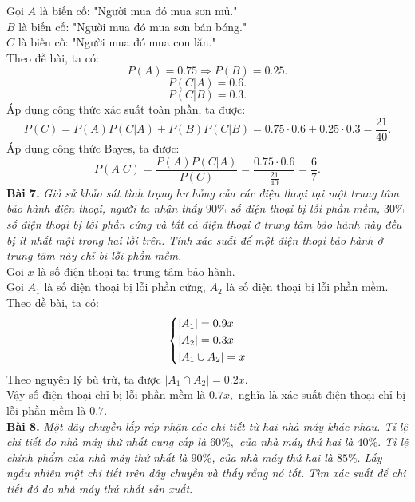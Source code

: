 \documentclass[12pt,a4paper]{article}
\begin{document}
Gọi $A$ là biến cố: "Người mua đó mua sơn mủ."\\
$B$ là biến cố: "Người mua đó mua sơn bán bóng."\\
$C$ là biến cố: "Người mua đó mua con lăn."\\
Theo đề bài, ta có:
$$P \left( A \right) = 0.75 \Rightarrow P \left( B \right) = 0.25.$$
$$P \left( {\left. C \right|A} \right) = 0.6.$$
$$P \left( {\left. C \right|B} \right) = 0.3.$$
Áp dụng công thức xác suất toàn phần, ta được:
$$P\left( C \right) = P\left( A \right)P\left( {\left. C \right|A} \right) + P\left( B \right)P\left( {\left. C \right|B} \right) = 0.75 \cdot 0.6 + 0.25 \cdot 0.3 = \frac{{21}}{{40}}.$$
Áp dụng công thức Bayes, ta được: 
$$P\left( {\left. A \right|C} \right) = \frac{{P\left( A \right)P\left( {\left. C \right|A} \right)}}{{P\left( C \right)}} = \frac{{0.75 \cdot 0.6}}{{\frac{{21}}{{40}}}} = \frac{6}{7}.$$
\textbf{Bài 7.} \textit{Giả sử khảo sát tình trạng hư hỏng của các điện thoại tại một trung tâm bảo hành điện thoại, người ta nhận thấy $90\%$ số điện thoại bị lỗi phần mềm, $30\%$ số điện thoại bị lỗi phần cứng và tất cả điện thoại ở trung tâm bảo hành này đều bị ít nhất một trong hai lỗi trên. Tính xác suất để một điện thoại bảo hành ở trung tâm này chỉ bị lỗi phần mềm.}\\
Gọi $x$ là số điện thoại tại trung tâm bảo hành.\\
Gọi $A_1$ là số điện thoại bị lỗi phần cứng, $A_2$ là số điện thoại bị lỗi phần mềm.\\
Theo đề bài, ta có:
$$\left\{ \begin{gathered}
  \left| {{A_1}} \right| = 0.9x \hfill \\
  \left| {{A_2}} \right| = 0.3x \hfill \\
  \left| {{A_1} \cup {A_2}} \right| = x \hfill \\ 
\end{gathered}  \right.$$
Theo nguyên lý bù trừ, ta được $\left| A_1 \cap A_2 \right| = 0.2x.$\\
Vậy số điện thoại chỉ bị lỗi phần mềm là $0.7x,$ nghĩa là xác suất điện thoại chỉ bị lỗi phần mềm là $0.7.$\\
\textbf{Bài 8.} \textit{Một dây chuyền lắp ráp nhận các chi tiết từ hai nhà máy khác nhau. Tỉ lệ chi tiết do nhà máy thứ nhất cung cấp là $60\%,$ của nhà máy thứ hai là $40\%.$ Tỉ lệ chính phẩm của nhà máy thứ nhất là $90\%$, của nhà máy thứ hai là $85\%.$ Lấy ngẫu nhiên một chi tiết trên dây chuyền và thấy rằng nó tốt. Tìm xác suất để chi tiết đó do nhà máy thứ nhất sản xuất.} \\
\end{document}
